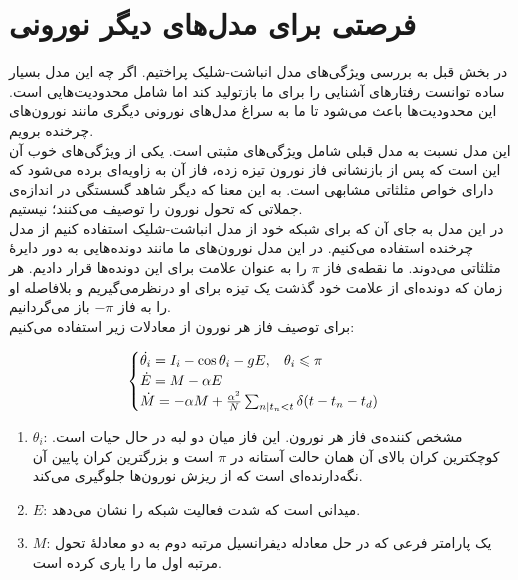 \section*{فرصتی برای مدل‌های دیگر نورونی}
در بخش قبل به بررسی ویژگی‌های مدل انباشت‌-شلیک پراختیم. اگر چه این مدل بسیار ساده توانست رفتارهای آشنایی را برای ما بازتولید کند اما شامل محدودیت‌هایی است. این محدودیت‌ها باعث می‌شود تا ما به سراغ مدل‌های نورونی دیگری مانند نورون‌های چرخنده برویم.\\
این مدل نسبت به مدل قبلی شامل ویژگی‌های مثبتی است. یکی از ویژگی‌های خوب آن این است که پس از بازنشانی فاز نورون تیزه زده، فاز آن به زاویه‌ای برده می‌شود که دارای خواص مثلثاتی مشابهی است. به این معنا که دیگر شاهد گسستگی در اندازه‌ی جملاتی که تحول نورون را توصیف می‌کنند؛ نیستیم.\\

\label{chap:rotational}
در این مدل به جای آن که برای شبکه خود از مدل انباشت-شلیک استفاده کنیم از مدل چرخنده استفاده می‌کنیم. در این مدل نورون‌های ما مانند دونده‌هایی به دور دایرهٔ مثلثاتی می‌دوند. ما نقطه‌ی فاز $\pi$ را به عنوان علامت برای این دونده‌ها قرار دادیم. هر زمان که دونده‌ای از علامت خود گذشت یک تیزه برای او درنظرمی‌گیریم و بلافاصله او را به فاز $-\pi$ باز می‌گردانیم.\\

برای توصیف فاز هر نورون از معادلات زیر استفاده می‌کنیم:
\begin{tcolorbox}
	\begin{equation}
		\begin{cases}
			\dot{\theta_i}=I_i - \cos{\theta_i} - g E, \hspace{2ex} \theta_i \leq \pi \\
			\dot{E} = M - \alpha E\\
			\dot{M} = -  \alpha M + \frac{ \alpha^{2} }{N} \sum_{n|t_{n}<t} \delta(t - t_n - t_d)
		\end{cases}
	\end{equation}
	\begin{enumerate}[-]
		\item $\theta_i$:
		مشخص کننده‌ی فاز هر نورون. این فاز میان دو لبه در حال حیات است. کوچکترین کران بالای آن همان حالت آستانه در $\pi$ است و بزرگترین کران پایین آن نگه‌دارنده‌ای است که از ریزش نورون‌ها جلوگیری می‌کند.
		\item $E$:
		میدانی است که شدت فعالیت شبکه را نشان می‌دهد.
		\item $M$:
		یک پارامتر فرعی که در حل معادله دیفرانسیل مرتبه دوم به دو معادلهٔ تحول مرتبه اول ما را یاری کرده است.
	\end{enumerate}
\end{tcolorbox}

